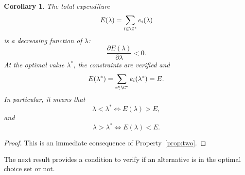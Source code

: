 \documentclass[12pt,a4paper]{article}
\newtheorem{corollary}{Corollary}
\begin{document}
\begin{corollary}
    \label{cor:total_consumption}
    The total expenditure
    \[
        E(\lambda) = \sum_{i\in \C^*} e_i(\lambda)
    \]
    is  a decreasing function of $\lambda$:
    \[
        \frac{\partial E(\lambda)}{\partial \lambda} < 0.
    \]
    At the optimal value  $\lambda^*$, the constraints are verified and
    \begin{equation}
        \label{eq:check_total_budget}
        E(\lambda^*) = \sum_{i\in \C^*} e_i(\lambda^*) = E.
    \end{equation}
    In particular, it means that
    \[
        \lambda < \lambda^* \iff E(\lambda) > E,
    \]
    and
    \[
        \lambda > \lambda^* \iff E(\lambda) < E.
    \]
\end{corollary}
\begin{proof} This is an immediate consequence of  Property~\ref{prop:two}.
\end{proof}


The next result provides a condition to verify if an alternative is in the optimal choice set or not.
\end{document}
